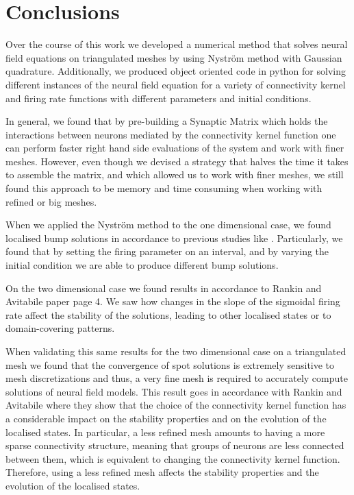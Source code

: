 \documentclass{uonmathreport}
\begin{document}
\section{Conclusions} \label{sec:conclusions}

Over the course of this work we developed a numerical method that solves neural field equations on triangulated meshes by using Nystr\"om method with Gaussian quadrature. Additionally, we produced object oriented code in python for solving different instances of the neural field equation for a variety of connectivity kernel and firing rate functions with different parameters and initial conditions.

In general, we found that by pre-building a Synaptic Matrix which holds the interactions between neurons mediated by the connectivity kernel function one can perform faster right hand side evaluations of the system and work with finer meshes. However, even though we devised a strategy that halves the time it takes to assemble the matrix, and which allowed us to work with finer meshes, we still found this approach to be memory and time consuming when working with refined or big meshes.

When we applied the Nystr\"om method to the one dimensional case, we found localised bump solutions in accordance to previous studies like \cite{LaingCarloR.2002MBia,rankin2014continuation}. Particularly, we found that by setting the firing parameter on an interval, and by varying the initial condition we are able to produce different bump solutions.

On the two dimensional case we found results in accordance to Rankin and Avitabile paper \cite{rankin2014continuation} page 4. We saw how changes in the slope of the sigmoidal firing rate affect the stability of the solutions, leading to other localised states or to domain-covering patterns.

When validating this same results for the two dimensional case on a triangulated mesh we found that the convergence of spot solutions is extremely sensitive to mesh discretizations and thus, a very fine mesh is required to accurately compute solutions of neural field models. This result goes in accordance with Rankin and Avitabile \cite{rankin2014continuation} where they show that the choice of the connectivity kernel function has a considerable impact on the stability properties and on the evolution of the localised states. In particular, a less refined mesh amounts to having a more sparse connectivity structure, meaning that groups of neurons are less connected between them, which is equivalent to changing the connectivity kernel function. Therefore, using a less refined mesh affects the stability properties and the evolution of the localised states.
\end{document}
